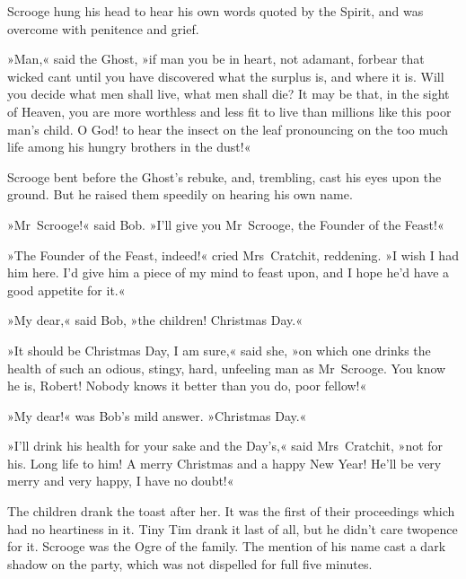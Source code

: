 Scrooge hung his head to hear his own words quoted by the Spirit, and was overcome with penitence and grief.

»Man,« said the Ghost, »if man you be in heart, not adamant, forbear that wicked cant until you have discovered what the surplus is, and where it is. Will you decide what men shall live, what men shall die? It may be that, in the sight of Heaven, you are more worthless and less fit to live than millions like this poor man's child. O God! to hear the insect on the leaf pronouncing on the too much life among his hungry brothers in the dust!«

Scrooge bent before the Ghost's rebuke, and, trembling, cast his eyes upon the ground. But he raised them speedily on hearing his own name.

»Mr~Scrooge!« said Bob. »I'll give you Mr~Scrooge, the Founder of the Feast!«

»The Founder of the Feast, indeed!« cried Mrs~Cratchit, reddening. »I wish I had him here. I'd give him a piece of my mind to feast upon, and I hope he'd have a good appetite for it.«

»My dear,« said Bob, »the children! Christmas Day.«

»It should be Christmas Day, I am sure,« said she, »on which one drinks the health of such an odious, stingy, hard, unfeeling man as Mr~Scrooge. You know he is, Robert! Nobody knows it better than you do, poor fellow!«

»My dear!« was Bob's mild answer. »Christmas Day.«

»I'll drink his health for your sake and the Day's,« said Mrs~Cratchit, »not for his. Long life to him! A merry Christmas and a happy New Year! He'll be very merry and very happy, I have no doubt!«

The children drank the toast after her. It was the first of their proceedings which had no heartiness in it. Tiny Tim drank it last of all, but he didn't care twopence for it. Scrooge was the Ogre of the family. The mention of his name cast a dark shadow on the party, which was not dispelled for full five minutes.


